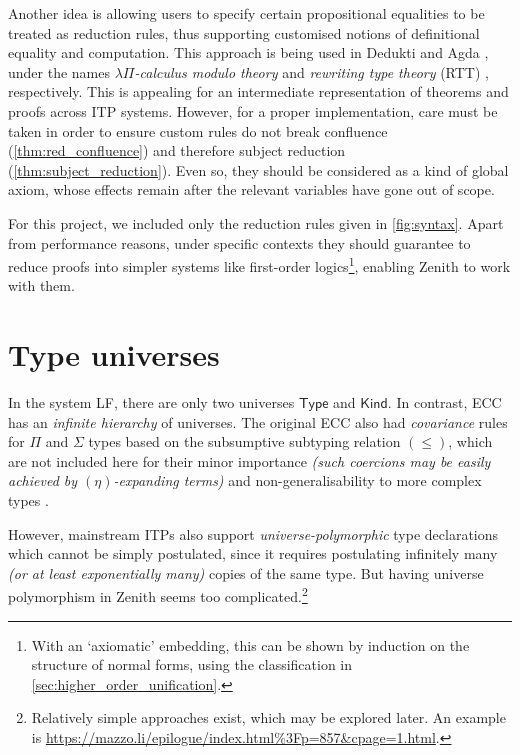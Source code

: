 \documentclass[twoside]{report}
\begin{document}
Another idea is allowing users to specify certain propositional equalities to be treated as reduction rules, thus supporting customised notions of definitional equality and computation. This approach is being used in Dedukti \cite{assaf2023dedukti} and Agda \cite{norell2007towards}, under the names \emph{$\lambda\Pi$-calculus modulo theory} \cite{boespflug2012lambdapi} and \emph{rewriting type theory} (RTT) \cite{cockx2021taming}, respectively. This is appealing for an intermediate representation of theorems and proofs across ITP systems. However, for a proper implementation, care must be taken in order to ensure custom rules do not break confluence (\cref{thm:red_confluence}) and therefore subject reduction (\cref{thm:subject_reduction}). Even so, they should be considered as a kind of global axiom, whose effects remain after the relevant variables have gone out of scope.

For this project, we included only the reduction rules given in \cref{fig:syntax}. Apart from performance reasons, under specific contexts they should guarantee to reduce proofs into simpler systems like first-order logics\footnote{With an `axiomatic' embedding, this can be shown by induction on the structure of normal forms, using the classification in \cref{sec:higher_order_unification}.}, enabling Zenith to work with them.

\section{Type universes}
\label{sec:universes}

In the system LF, there are only two universes $\mathsf{Type}$ and $\mathsf{Kind}$. In contrast, ECC has an \emph{infinite hierarchy} of universes. The original ECC also had \emph{covariance} rules for $\Pi$ and $\Sigma$ types based on the subsumptive subtyping relation $(\leq)$, which are not included here for their minor importance \emph{(such coercions may be easily achieved by $(\eta)$-expanding terms)} and non-generalisability to more complex types \cite{luo2012notes}.

However, mainstream ITPs also support \emph{universe-polymorphic} type declarations which cannot be simply postulated, since it requires postulating infinitely many \emph{(or at least exponentially many)} copies of the same type. But having universe polymorphism in Zenith seems too complicated.\footnote{Relatively simple approaches exist, which may be explored later. An example is \url{https://mazzo.li/epilogue/index.html\%3Fp=857&cpage=1.html}.}
\end{document}
